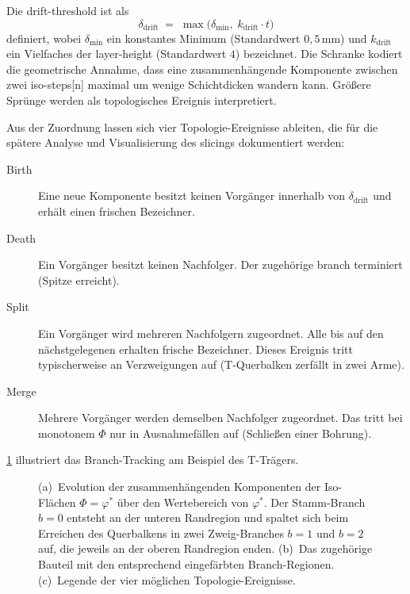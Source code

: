                 Die \gls{drift-threshold} ist als
                \begin{equation}
                    \delta_\text{drift} \;=\; \max\!\bigl(\delta_\text{min},\; k_\text{drift} \cdot t\bigr)
                    \label{eq:concept-crystal-drift-threshold}
                \end{equation}
                definiert, wobei $\delta_\text{min}$ ein konstantes Minimum (Standardwert $0{,}5\,\text{mm}$) und $k_\text{drift}$ ein Vielfaches der \gls{layer-height} (Standardwert $4$) bezeichnet.
                Die Schranke kodiert die geometrische Annahme, dass eine zusammenhängende Komponente zwischen zwei \glspl{iso-step}[n] maximal um wenige Schichtdicken wandern kann.
                Größere Sprünge werden als topologisches Ereignis interpretiert.

                Aus der Zuordnung lassen sich vier Topologie-Ereignisse ableiten, die für die spätere Analyse und Visualisierung des \glspl{slicing} dokumentiert werden:

                \begin{description}
                    \item[Birth] Eine neue Komponente besitzt keinen Vorgänger innerhalb von $\delta_\text{drift}$ und erhält einen frischen Bezeichner.
                    \item[Death] Ein Vorgänger besitzt keinen Nachfolger. Der zugehörige \gls{branch} terminiert (Spitze erreicht).
                    \item[Split] Ein Vorgänger wird mehreren Nachfolgern zugeordnet. Alle bis auf den nächstgelegenen erhalten frische Bezeichner. Dieses Ereignis tritt typischerweise an Verzweigungen auf (T-Querbalken zerfällt in zwei Arme).
                    \item[Merge] Mehrere Vorgänger werden demselben Nachfolger zugeordnet. Das tritt bei monotonem $\Phi$ nur in Ausnahmefällen auf (Schließen einer Bohrung).
                \end{description}

                \cref{fig:concept-crystal-branch-tracking} illustriert das Branch-Tracking am Beispiel des T-Trägers.

                \begin{figure}[ht]
                    \centering
                    
                    \caption[Branch-Tracking am T-Träger als Topologie-Diagramm]{
                        (a)~Evolution der zusammenhängenden Komponenten der Iso-Flächen $\Phi = \varphi^*$ über den Wertebereich von $\varphi^*$.
                            Der Stamm-Branch $b=0$ entsteht an der unteren Randregion und spaltet sich beim Erreichen des Querbalkens in zwei Zweig-Branches $b=1$ und $b=2$ auf, die jeweils an der oberen Randregion enden.
                        (b)~Das zugehörige Bauteil mit den entsprechend eingefärbten Branch-Regionen.
                        (c)~Legende der vier möglichen Topologie-Ereignisse.
                    }
                    \label{fig:concept-crystal-branch-tracking}
                \end{figure}

